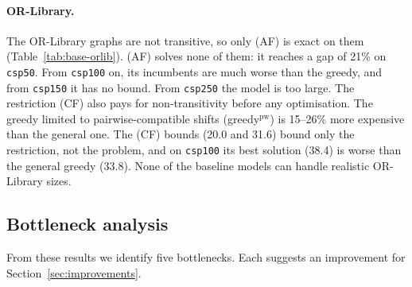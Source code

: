 \begin{table}[ht]
\centering
\small
\setlength{\tabcolsep}{4.5pt}
\caption{Factor suite ($n=40$, 3 seeds per variant, one parameter changed
from the default): solved, mean time [s], mean final gap [\%].}
\label{tab:base-factor}

\end{table}

\paragraph{OR-Library.} The OR-Library graphs are not transitive, so only
(AF) is exact on them (Table~\ref{tab:base-orlib}). (AF) solves none of them:
it reaches a gap of 21\% on \texttt{csp50}. From \texttt{csp100} on, its
incumbents are much worse than the greedy, and from \texttt{csp150} it has no
bound. From \texttt{csp250} the model is too large. The restriction (CF) also
pays for non-transitivity before any optimisation. The greedy limited to
pairwise-compatible shifts (greedy$^{\mathrm{pw}}$) is 15--26\% more expensive
than the general one. The (CF) bounds (20.0 and 31.6) bound only the
restriction, not the problem, and on \texttt{csp100} its best solution (38.4)
is worse than the general greedy (33.8). None of the baseline models can
handle realistic OR-Library sizes.

\begin{table}[ht]
\centering
\small
\setlength{\tabcolsep}{4pt}
\caption{OR-Library instances ($W=480$, $T=720$). LB is the combinatorial
lower bound of Section~\ref{sec:inst-stats}; greedy is the general greedy and
greedy$^{\mathrm{pw}}$ the pairwise one used for (CF). The (CF) bound is a
bound of the restriction only. ``none'': the root node did not finish;
``large'': over 4 million non-zeros.}
\label{tab:base-orlib}

\end{table}

\subsection{Bottleneck analysis}
\label{sec:bottlenecks}

From these results we identify five bottlenecks. Each suggests an improvement
for Section~\ref{sec:improvements}.

